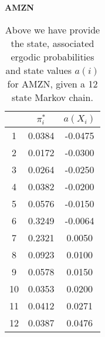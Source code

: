 \begin{table}[htpb]

\centering
\small
\textbf{AMZN}

\vspace{\baselineskip}

\begin{tabular}{ c | c | c }
 & $\pi_i^*$ & $a(X_i)$\\
\hline
1 & 0.0384 & -0.0475\\
2 & 0.0172 & -0.0300\\
3 & 0.0264 & -0.0250\\
4 & 0.0382 & -0.0200\\
5 & 0.0576 & -0.0150\\
6 & 0.3249 & -0.0064\\
7 & 0.2321 & 0.0050\\
8 & 0.0923 & 0.0100\\
9 & 0.0578 & 0.0150\\
10 & 0.0353 & 0.0200\\
11 & 0.0412 & 0.0271\\
12 & 0.0387 & 0.0476
\end{tabular}

\caption{\label{table:AMZN_data} Above we have provide the state, associated ergodic probabilities and state values $a(i)$ for AMZN, given a 12 state Markov chain.}
\end{table}
